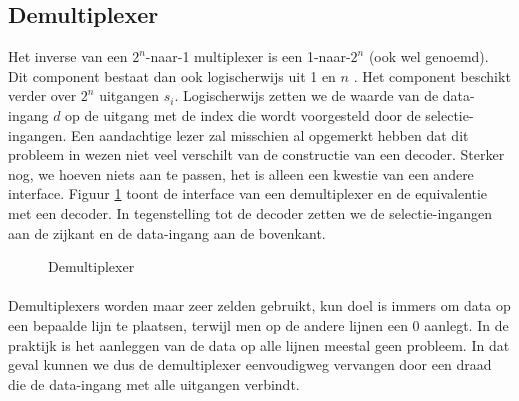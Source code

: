 \subsection{Demultiplexer}
\label{ss:demultiplexer}
Het inverse van een $2^n$-naar-1 multiplexer is een 1-naar-$2^n$  (ook wel  genoemd). Dit component bestaat dan ook logischerwijs uit 1  en $n$ . Het component beschikt verder over $2^n$ uitgangen $s_i$. Logischerwijs zetten we de waarde van de data-ingang $d$ op de uitgang met de index die wordt voorgesteld door de selectie-ingangen. Een aandachtige lezer zal misschien al opgemerkt hebben dat dit probleem in wezen niet veel verschilt van de constructie van een decoder. Sterker nog, we hoeven niets aan te passen, het is alleen een kwestie van een andere interface. Figuur \ref{fig:demultiplexer} toont de interface van een demultiplexer en de equivalentie met een decoder. In tegenstelling tot de decoder zetten we de selectie-ingangen aan de zijkant en de data-ingang aan de bovenkant.
\begin{figure}[hbt]
\centering
{}
\caption{Demultiplexer}
\label{fig:demultiplexer}
\end{figure}
\paragraph{}
Demultiplexers worden maar zeer zelden gebruikt, kun doel is immers om data op een bepaalde lijn te plaatsen, terwijl men op de andere lijnen een 0 aanlegt. In de praktijk is het aanleggen van de data op alle lijnen meestal geen probleem. In dat geval kunnen we dus de demultiplexer eenvoudigweg vervangen door een draad die de data-ingang met alle uitgangen verbindt.
